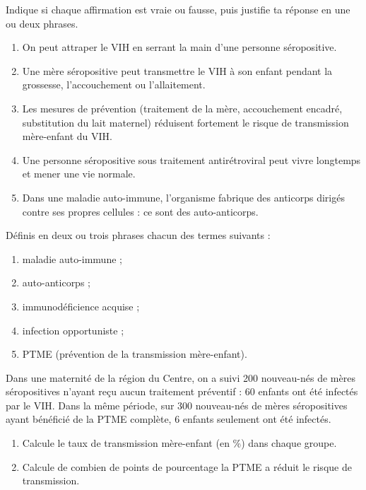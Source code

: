 \documentclass[11pt]{article}
\begin{document}
\begin{exercice}
Indique si chaque affirmation est vraie ou fausse, puis justifie ta réponse en une ou deux phrases.
\begin{enumerate}
\item On peut attraper le VIH en serrant la main d'une personne séropositive.
\item Une mère séropositive peut transmettre le VIH à son enfant pendant la grossesse, l'accouchement ou l'allaitement.
\item Les mesures de prévention (traitement de la mère, accouchement encadré, substitution du lait maternel) réduisent fortement le risque de transmission mère-enfant du VIH.
\item Une personne séropositive sous traitement antirétroviral peut vivre longtemps et mener une vie normale.
\item Dans une maladie auto-immune, l'organisme fabrique des anticorps dirigés contre ses propres cellules : ce sont des auto-anticorps.
\end{enumerate}
\end{exercice}

\begin{exercice}[Définitions]
Définis en deux ou trois phrases chacun des termes suivants :
\begin{enumerate}
\item maladie auto-immune ;
\item auto-anticorps ;
\item immunodéficience acquise ;
\item infection opportuniste ;
\item PTME (prévention de la transmission mère-enfant).
\end{enumerate}
\end{exercice}

\begin{exercice}
Dans une maternité de la région du Centre, on a suivi 200 nouveau-nés de mères séropositives n'ayant reçu aucun traitement préventif : 60 enfants ont été infectés par le VIH. Dans la même période, sur 300 nouveau-nés de mères séropositives ayant bénéficié de la PTME complète, 6 enfants seulement ont été infectés.
\begin{enumerate}
\item Calcule le taux de transmission mère-enfant (en \%) dans chaque groupe.
\item Calcule de combien de points de pourcentage la PTME a réduit le risque de transmission.
\end{enumerate}
\end{exercice}
\end{document}
